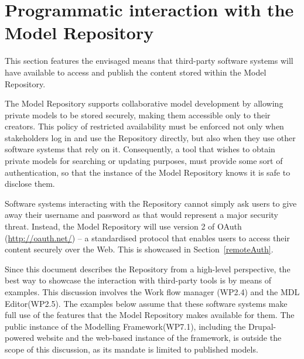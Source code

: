 \section{Programmatic interaction with the \ddmore Model Repository}
\label{indirectInteraction}
This section features the envisaged means that third-party software systems will have available to access and publish the content stored within the \ddmore Model Repository.

The \ddmore Model Repository supports collaborative model development by allowing private models to be stored securely, making them accessible only to their creators. This policy of restricted availability must be enforced not only when stakeholders log in and use the Repository directly, but also when they use other software systems that rely on it. Consequently, a tool that wishes to obtain private models for searching or updating purposes, must provide some sort of authentication, so that the instance of the Model Repository knows it is safe to disclose them. 

Software systems interacting with the Repository cannot simply ask users to give away their username and password as that would represent a major security threat. Instead, the \ddmore Model Repository will use version 2 of OAuth (\url{http://oauth.net/}) -- a standardised protocol that enables users to access their content securely over the Web. This is showcased in Section~\ref{remoteAuth}.

Since this document describes the Repository from a high-level perspective, the best way to showcase the interaction with third-party tools is by means of examples. This discussion involves the Work flow manager (WP2.4) and the MDL Editor(WP2.5). The examples below assume that these software systems make full use of the features that the Model Repository makes available for them. The public instance of the Modelling Framework(WP7.1), including the Drupal-powered website and the web-based instance of the framework, is outside the scope of this discussion, as its mandate is limited to published models. 

